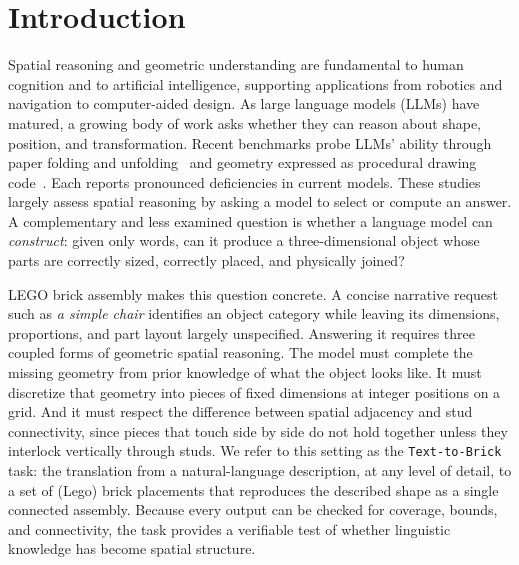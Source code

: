 



\section{Introduction}
Spatial reasoning and geometric understanding are fundamental to human cognition and to artificial intelligence, supporting applications from robotics and navigation to computer-aided design.
As large language models (LLMs) have matured, a growing body of work asks whether they can reason about shape, position, and transformation. Recent benchmarks probe LLMs' ability through 
paper folding and unfolding~\cite{zhou2026paperfoldingpuzzle} and geometry expressed as procedural drawing code~\cite{luo2026geogrambench}. Each reports pronounced deficiencies in current models. These studies largely assess spatial reasoning by asking a model to select or compute an answer. A complementary and less examined question is whether a language model can \emph{construct}: given only words, can it produce a three-dimensional object whose parts are correctly sized, correctly placed, and physically joined?

LEGO brick assembly makes this question concrete. A concise narrative request such as \emph{a simple chair} identifies an object category while leaving its dimensions, proportions, and part layout largely unspecified. Answering it requires three coupled forms of geometric spatial reasoning. The model must complete the missing geometry from prior knowledge of what the object looks like. It must discretize that geometry into pieces of fixed dimensions at integer positions on a grid. And it must respect the difference between spatial adjacency and stud connectivity, since pieces that touch side by side do not hold together unless they interlock vertically through studs. We refer to this setting as the \texttt{Text-to-Brick} task: the translation from a natural-language description, at any level of detail, to a set of (Lego) brick placements that reproduces the described shape as a single connected assembly. Because every output can be checked for coverage, bounds, and connectivity, the task provides a verifiable test of whether linguistic knowledge has become spatial structure.

